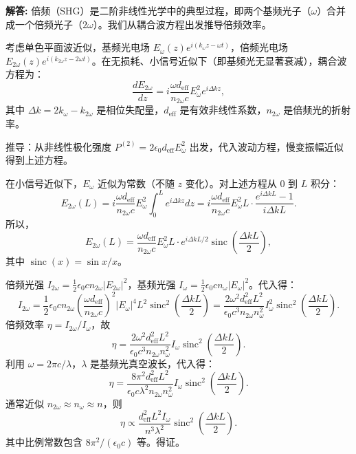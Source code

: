 \documentclass[12pt, a4paper, oneside]{ctexart}
\newenvironment{solution}{\par\noindent\textbf{解答:}\quad}{\par}
\begin{document}
\begin{solution}
    倍频（SHG）是二阶非线性光学中的典型过程，即两个基频光子（$\omega$）合并成一个倍频光子（$2\omega$）。我们从耦合波方程出发推导倍频效率。

    考虑单色平面波近似，基频光电场 $E_\omega(z) e^{i(k_\omega z - \omega t)}$，倍频光电场 $E_{2\omega}(z) e^{i(k_{2\omega} z - 2\omega t)}$。在无损耗、小信号近似下（即基频光无显著衰减），耦合波方程为：
    \[
    \frac{d E_{2\omega}}{dz} = i \frac{\omega d_{\text{eff}}}{n_{2\omega} c} E_\omega^2 e^{i \Delta k z},
    \]
    其中 $\Delta k = 2k_\omega - k_{2\omega}$ 是相位失配量，$d_{\text{eff}}$ 是有效非线性系数，$n_{2\omega}$ 是倍频光的折射率。

    推导：从非线性极化强度 $P^{(2)} = 2\epsilon_0 d_{\text{eff}} E_\omega^2$ 出发，代入波动方程，慢变振幅近似得到上述方程。

    在小信号近似下，$E_\omega$ 近似为常数（不随 $z$ 变化）。对上述方程从 $0$ 到 $L$ 积分：
    \[
    E_{2\omega}(L) = i \frac{\omega d_{\text{eff}}}{n_{2\omega} c} E_\omega^2 \int_0^L e^{i \Delta k z} dz = i \frac{\omega d_{\text{eff}}}{n_{2\omega} c} E_\omega^2 L \cdot \frac{e^{i \Delta k L} - 1}{i \Delta k L}.
    \]
    所以，
    \[
    E_{2\omega}(L) = \frac{\omega d_{\text{eff}}}{n_{2\omega} c} E_\omega^2 L \cdot e^{i \Delta k L/2} \operatorname{sinc}\left( \frac{\Delta k L}{2} \right),
    \]
    其中 $\operatorname{sinc}(x) = \sin x / x$。

    倍频光强 $I_{2\omega} = \frac{1}{2} \epsilon_0 c n_{2\omega} |E_{2\omega}|^2$，基频光强 $I_\omega = \frac{1}{2} \epsilon_0 c n_\omega |E_\omega|^2$。代入得：
    \[
    I_{2\omega} = \frac{1}{2} \epsilon_0 c n_{2\omega} \left( \frac{\omega d_{\text{eff}}}{n_{2\omega} c} \right)^2 |E_\omega|^4 L^2 \operatorname{sinc}^2\left( \frac{\Delta k L}{2} \right) = \frac{2 \omega^2 d_{\text{eff}}^2 L^2}{\epsilon_0 c^3 n_{2\omega} n_\omega^2} I_\omega^2 \operatorname{sinc}^2\left( \frac{\Delta k L}{2} \right).
    \]
    倍频效率 $\eta = I_{2\omega} / I_\omega$，故
    \[
    \eta = \frac{2 \omega^2 d_{\text{eff}}^2 L^2}{\epsilon_0 c^3 n_{2\omega} n_\omega^2} I_\omega \operatorname{sinc}^2\left( \frac{\Delta k L}{2} \right).
    \]
    利用 $\omega = 2\pi c / \lambda$，$\lambda$ 是基频光真空波长，代入得：
    \[
    \eta = \frac{8\pi^2 d_{\text{eff}}^2 L^2}{\epsilon_0 c \lambda^2 n_{2\omega} n_\omega^2} I_\omega \operatorname{sinc}^2\left( \frac{\Delta k L}{2} \right).
    \]
    通常近似 $n_{2\omega} \approx n_\omega \approx n$，则
    \[
    \eta \propto \frac{d_{\text{eff}}^2 L^2 I_\omega}{n^3 \lambda^2} \operatorname{sinc}^2 \left( \frac{\Delta k L}{2} \right).
    \]
    其中比例常数包含 $8\pi^2/(\epsilon_0 c)$ 等。得证。
\end{solution}
\end{document}
